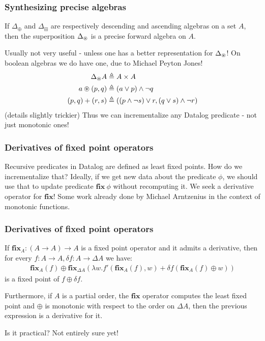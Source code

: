 \documentclass[english]{beamer}
\theoremstyle{plain}
\theoremstyle{remark}
\theoremstyle{remark}
\theoremstyle{remark}
\theoremstyle{definition}
\theoremstyle{definition}
\newcommand{\ra}[0]{\rightarrow}
\newcommand{\defeq}[0]{\triangleq}
\begin{document}
\begin{frame}
  \frametitle{Synthesizing precise algebras}
  \begin{lemma}
    If $\Delta_\oplus$ and $\Delta_\boxplus$ are respectively descending and ascending algebras
    on a set $A$, then the superposition $\Delta_\circledast$ is a precise forward algebra on $A$.
  \end{lemma}
  \vfill
  Usually not very useful - unless one has a better representation for $\Delta_\circledast$!
  \vfill
  On boolean algebras we do have one, due to Michael Peyton Jones!
  \begin{align*}
    \Delta_\cast A &\defeq A \times A\\
    a \cast (p, q) &\defeq (a \vee p) \wedge \neg q\\
    (p, q) + (r, s) &\defeq ((p \wedge \neg s) \vee r, (q \vee s) \wedge \neg r)
  \end{align*}
  (details slightly trickier)
  \vfill
  Thus we can incrementalize any Datalog predicate - not just monotonic ones!
\end{frame}

\begin{frame}
  \frametitle{Derivatives of fixed point operators}
  Recursive predicates in Datalog are defined as least fixed points.
  \vfill
  How do we incrementalize that?
  \vfill
  Ideally, if we get new data about the predicate $\phi$, we should use that to update
  predicate $\textbf{fix}\ \phi$ without recomputing it.
  \vfill
  We seek a derivative operator for $\textbf{fix}$!
  \vfill
  Some work already done by Michael Arntzenius in the context of monotonic functions.
\end{frame}

\begin{frame}
  \frametitle{Derivatives of fixed point operators}
  \begin{theorem}
    If $\textbf{fix}_A : (A \ra A) \ra A$ is a fixed point operator and it admits a derivative,
    then for every $f : A \ra A, \delta f : A \ra \Delta A$ we have:
    \begin{align*}
      \textbf{fix}_A(f) \oplus
      \textbf{fix}_{\Delta A}(\lambda w . f'(\textbf{fix}_A(f), w) +
      \delta f (\textbf{fix}_A(f) \oplus w))
    \end{align*}
    is a fixed point of $f \oplus \delta f$.

    Furthermore, if $A$ is a partial order, the $\textbf{fix}$ operator
    computes the least fixed point and $\oplus$ is monotonic with respect to the order on
    $\Delta A$, then the previous expression is a derivative
    for it.
  \end{theorem}
  \vfill
  Is it practical? Not entirely sure yet!
\end{frame}
\end{document}
